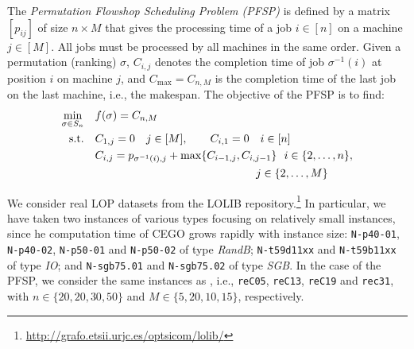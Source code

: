 \documentclass[sigconf,dvipsnames]{acmart}
\begin{document}
The \emph{Permutation Flowshop Scheduling Problem (PFSP)} is defined by a matrix $[p_{ij}]$ of size $n \times M$ that gives the processing time of a job $i \in [n]$ on a machine $j \in [M]$. All jobs must be processed by all machines in the same order. Given a permutation (ranking) $\sigma$, $C_{i,j}$ denotes the completion time of job $\sigma^{-1}(i)$ at position $i$ on machine $j$, and $C_{\max} = C_{n,M}$  is the completion time of the last job on the last machine, i.e., the makespan. The objective of the PFSP is to find:
\begin{equation}\label{eq:pfsp}
  \begin{split}
    \min_{\sigma \in S_n}\quad& f(\sigma) = C_{n,M}\\
    \text{s.t.}\quad & C_{1,j} = 0 \quad j\in [M], \qquad C_{i,1} = 0\quad i \in [n]\\
    &C_{i,j} = p_{\sigma^{-1}(i),j} + \max\{C_{i-1, j}, C_{i, j-1}\}  \ \  i \in \{2,\dotsc,n\},\\
    &\hspace{14.5em} j \in\{2,\dotsc, M\}
  \end{split}
\end{equation}

%
We consider real LOP datasets from the LOLIB
repository.\footnote{\url{http://grafo.etsii.urjc.es/optsicom/lolib/}} In
particular, we have taken two instances of various types focusing on relatively
small instances, since he computation time of CEGO grows rapidly with instance
size: \texttt{N-p40-01}, \texttt{N-p40-02}, \texttt{N-p50-01} and
\texttt{N-p50-02} of type \emph{RandB}; \texttt{N-t59d11xx} and
\texttt{N-t59b11xx} of type \emph{IO}; and \texttt{N-sgb75.01} and
\texttt{N-sgb75.02} of type \emph{SGB}.
In the case of the PFSP, we consider the same instances as
\citet{ZaeStoBar2014:ppsn}, i.e., \texttt{reC05}, \texttt{reC13},
\texttt{reC19} and \texttt{rec31}, with $n \in \{20, 20, 30, 50\}$ and $M \in \{5, 20, 10, 15\}$, respectively.
\end{document}
